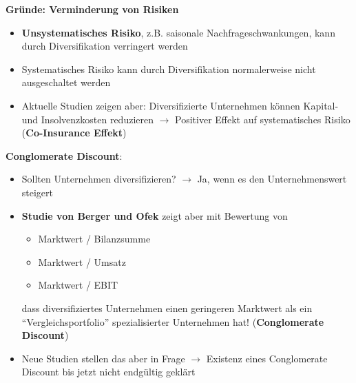 \textbf{Gründe: Verminderung von Risiken}
\begin{itemize}
	\item \textbf{Unsystematisches Risiko}, z.B. saisonale Nachfrageschwankungen, kann durch Diversifikation verringert werden
	\item Systematisches Risiko kann durch Diversifikation normalerweise nicht ausgeschaltet werden
	\item Aktuelle Studien zeigen aber: Diversifizierte Unternehmen können Kapital- und Insolvenzkosten reduzieren $\rightarrow$ Positiver Effekt auf systematisches Risiko (\textbf{Co-Insurance Effekt})
\end{itemize}
\bigskip
\textbf{Conglomerate Discount}:
\begin{itemize}
	\item Sollten Unternehmen diversifizieren? $\rightarrow$ Ja, wenn es den Unternehmenswert steigert
	\item \textbf{Studie von Berger und Ofek} zeigt aber mit Bewertung von
	\begin{itemize}
		\item Marktwert / Bilanzsumme
		\item Marktwert / Umsatz
		\item Marktwert / EBIT
	\end{itemize}
	dass diversifiziertes Unternehmen einen geringeren Marktwert als ein \enquote{Vergleichsportfolio} spezialisierter Unternehmen hat! (\textbf{Conglomerate Discount})
	\item Neue Studien stellen das aber in Frage $\rightarrow$ Existenz eines Conglomerate Discount bis jetzt nicht endgültig geklärt 
\end{itemize}